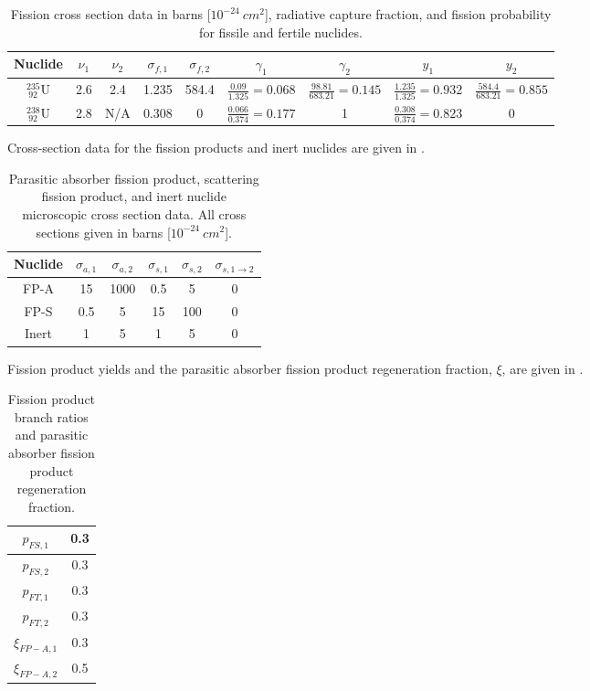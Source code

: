 \begin{table}[!hbp]
\begin{center}
\begin{tabular}{|c|c|c|c|c|c|c|c|c|}
\hline
Nuclide &	  $\nu_1$ &	$\nu_2$ & $\sigma_{f,1}$ & $\sigma_{f,2} $ & $\gamma_1$ & $\gamma_2$ &  $y_1$ & $y_2$ \\
\hline
$^{235} _{~92} \text{U}$   & 2.6 & 2.4 & 1.235  &  584.4 & $\frac{0.09}{1.325}=0.068$ & $\frac{98.81}{683.21}=0.145$ & $\frac{1.235}{1.325}=0.932$ & $\frac{584.4}{683.21}=0.855$ \\
\hline
$^{238} _{~92} \text{U}$   & 2.8 & N/A & 0.308 &  0  &  $\frac{0.066}{0.374}=0.177 $  & 1 &  $\frac{0.308}{0.374}=0.823$ & 0 \\
\hline
\end{tabular}	
\end{center}
\caption{Fission cross section data in barns [$10^{-24}~cm^2$], radiative capture fraction, and fission probability for fissile and fertile nuclides.}
\label{tbl:fission_data}
\end{table}

Cross-section data for the fission products and inert nuclides are given in .
\begin{table}[!htp]
\begin{center}
\begin{tabular}{|c|c|c|c|c|c|}
\hline
Nuclide  & $\sigma_{a,1}$ & $\sigma_{a,2}$	& $\sigma_{s,1}$	& $\sigma_{s,2}$ & $\sigma_{s,1\to2} $\\
\hline
FP-A & 15  & 1000  & 0.5  & 5 & 0 \\
\hline
FP-S  & 0.5  & 5  & 15  & 100 & 0 \\
\hline
Inert & 1 & 5  & 1 & 5 & 0 \\
\hline
\end{tabular}
\end{center}
\caption{Parasitic absorber fission product, scattering fission product, and inert nuclide microscopic cross section data.  All cross sections given in barns [$10^{-24}~cm^2$].}
\label{tbl:fp-data}
\end{table}
Fission product yields and the parasitic absorber fission product regeneration fraction, $\xi$, are given in .
\begin{table}[!htp]
\begin{center}
\begin{tabular}{|c|c|}
\hline
$p_{FS,1} $& 0.3\\
\hline
$p_{FS,2} $& 0.3\\
\hline
$p_{FT,1} $& 0.3\\
\hline
$p_{FT,2}$ & 0.3\\
\hline
$\xi_{FP-A,1}$ & 0.3 \\
\hline
$\xi_{FP-A,2}$ & 0.5\\
\hline
\end{tabular}
\end{center}
\caption{Fission product branch ratios and parasitic absorber fission product regeneration fraction.}
\label{tbl:fp_misc}
\end{table}

